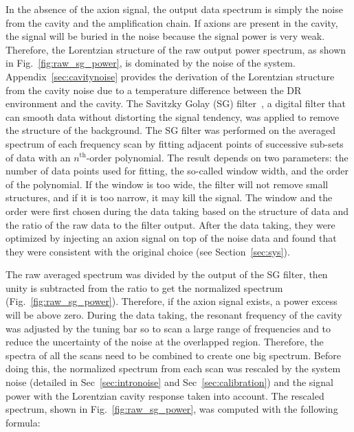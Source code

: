 In the absence of the axion signal, the output data spectrum is simply the 
noise from the cavity and the amplification chain. If axions are present 
in the cavity, the signal will be buried in the noise because the 
signal power is very weak. Therefore, the Lorentzian structure of the raw 
output power spectrum, as shown in Fig.~\ref{fig:raw_sg_power}, is dominated 
by the noise of the system. 
Appendix~\ref{sec:cavitynoise} provides the derivation of the Lorentzian 
structure from the cavity noise due to a temperature difference 
between the DR environment and the cavity. The Savitzky Golay (SG) 
filter~\cite{SGFilter}, a digital filter that can smooth data without 
distorting the signal tendency, was applied to remove the structure of the  
background. The SG filter was performed on the averaged spectrum of each 
frequency scan by fitting adjacent points of successive sub-sets of data with 
an $n^\text{th}$-order polynomial. The result depends on two parameters: 
the number of 
data points used for fitting, the so-called window width, and the order of 
the polynomial. If the window is too wide, the filter will not remove small 
structures, and if it is too narrow, it may kill the signal. 
The window and the order were first chosen during the data taking based on 
the structure of data and the ratio of the raw data to the filter output. 
After the data taking, they were optimized by injecting an axion signal on top of 
the noise data and found that they were consistent with the original choice 
(see Section~\ref{sec:sys}). 

The raw averaged spectrum was divided by the output of the SG filter, then  
unity is subtracted from the ratio to get the normalized spectrum 
(Fig.~\ref{fig:raw_sg_power}).
Therefore, if the axion signal exists, a power excess will be above zero.
During the data taking, the resonant frequency of the cavity was  
adjusted by the tuning bar so to scan a large range of frequencies and to 
reduce the uncertainty of the noise at the overlapped region. Therefore, the 
spectra of all the scans need to be combined to create one big spectrum. 
Before doing this, 
the normalized spectrum from each scan was rescaled by the system noise 
(detailed in Sec~\ref{sec:intronoise} and Sec~\ref{sec:calibration}) and the 
signal power with the Lorentzian cavity response taken into account. The 
rescaled spectrum, shown in 
Fig.~\ref{fig:raw_sg_power}, was computed with the following formula:

